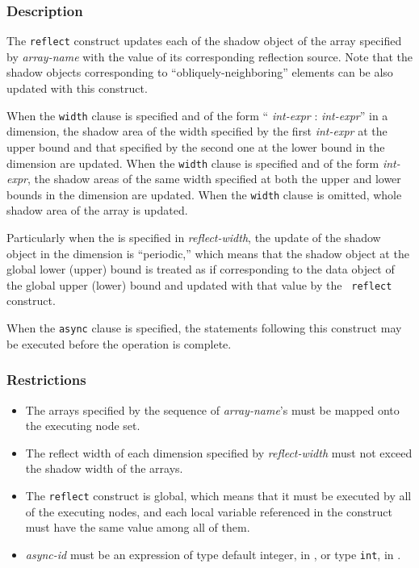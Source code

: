 \subsubsection*{Description}

The {\tt reflect} construct updates each of the shadow object of the
array specified by {\it array-name} with the value of its corresponding
reflection source. Note that the shadow objects corresponding to
``obliquely-neighboring'' elements can be also updated with this
construct.


When the {\tt width} clause is specified and of the form ``{\it
int-expr} : {\it int-expr}'' in a dimension, the shadow area of the
width specified by the first {\it int-expr} at the upper bound and that
specified by the second one at the lower bound in the dimension are
updated.
%
When the {\tt width} clause is specified and of the form {\it int-expr},
the shadow areas of the same width specified at both the upper
and lower bounds in the dimension are updated.
%
When the {\tt width} clause is omitted, whole shadow area of the array
is updated.

Particularly when the  is specified in
{\it reflect-width}, the update of the shadow object in the dimension is
``periodic,'' which means that the shadow object at the global lower
(upper) bound is treated as if corresponding to the data object of the
global upper (lower) bound and updated with that value by the {\tt
reflect} construct.

When the {\tt async} clause is specified, the statements following this
construct may be executed before the operation is complete.

\subsubsection*{Restrictions}

\begin{itemize}
 \item The arrays specified by the sequence of {\it array-name}'s must
       be mapped onto the executing node set.
 \item The reflect width of each dimension specified by {\it
       reflect-width} must not exceed the shadow width of the arrays.
 \item The {\tt reflect} construct is global, which means that it must be
       executed by all of the executing nodes, and each local variable
       referenced in the construct must have the same value among all of
       them.
 \item {\it async-id} must be an expression of type default integer, in
       {\XMPF}, or type {\tt int}, in {\XMPC}.
\end{itemize}

